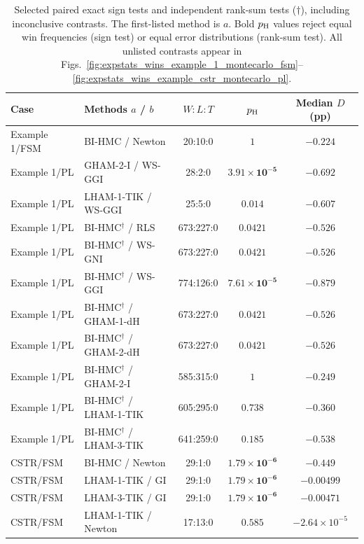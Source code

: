 \begin{table}[!htbp]
\centering
\small
\caption{Selected paired exact sign tests and independent rank-sum tests ($\dagger$), including inconclusive contrasts. The first-listed method is $a$. Bold $p_{\rm H}$ values reject equal win frequencies (sign test) or equal error distributions (rank-sum test). All unlisted contrasts appear in Figs.~\ref{fig:expstats_wins_example_1_montecarlo_fsm}--\ref{fig:expstats_wins_example_cstr_montecarlo_pl}.}
\label{tab:expstats_paired}
\setlength{\tabcolsep}{5pt}
\renewcommand{\arraystretch}{1.12}
\begin{tabular}{@{}llccc@{}}
\toprule
Case & Methods $a$ / $b$ & $W:L:T$ & $p_{\rm H}$ & Median $D$ (pp) \\
\midrule
Example 1/FSM & BI-HMC / Newton & 20:10:0 & $1$ & $-0.224$ \\
Example 1/PL & GHAM-2-I / WS-GGI & 28:2:0 & $\mathbf{3.91\times10^{-5}}$ & $-0.692$ \\
Example 1/PL & LHAM-1-TIK / WS-GGI & 25:5:0 & $\mathbf{0.014}$ & $-0.607$ \\
Example 1/PL & BI-HMC$^\dagger$ / RLS & 673:227:0 & $\mathbf{0.0421}$ & $-0.526$ \\
Example 1/PL & BI-HMC$^\dagger$ / WS-GNI & 673:227:0 & $\mathbf{0.0421}$ & $-0.526$ \\
Example 1/PL & BI-HMC$^\dagger$ / WS-GGI & 774:126:0 & $\mathbf{7.61\times10^{-5}}$ & $-0.879$ \\
Example 1/PL & BI-HMC$^\dagger$ / GHAM-1-dH & 673:227:0 & $\mathbf{0.0421}$ & $-0.526$ \\
Example 1/PL & BI-HMC$^\dagger$ / GHAM-2-dH & 673:227:0 & $\mathbf{0.0421}$ & $-0.526$ \\
Example 1/PL & BI-HMC$^\dagger$ / GHAM-2-I & 585:315:0 & $1$ & $-0.249$ \\
Example 1/PL & BI-HMC$^\dagger$ / LHAM-1-TIK & 605:295:0 & $0.738$ & $-0.360$ \\
Example 1/PL & BI-HMC$^\dagger$ / LHAM-3-TIK & 641:259:0 & $0.185$ & $-0.538$ \\
CSTR/FSM & BI-HMC / Newton & 29:1:0 & $\mathbf{1.79\times10^{-6}}$ & $-0.449$ \\
CSTR/FSM & LHAM-1-TIK / GI & 29:1:0 & $\mathbf{1.79\times10^{-6}}$ & $-0.00499$ \\
CSTR/FSM & LHAM-3-TIK / GI & 29:1:0 & $\mathbf{1.79\times10^{-6}}$ & $-0.00471$ \\
CSTR/FSM & LHAM-1-TIK / Newton & 17:13:0 & $0.585$ & $-2.64\times10^{-5}$ \\

\end{tabular}
\end{table}
